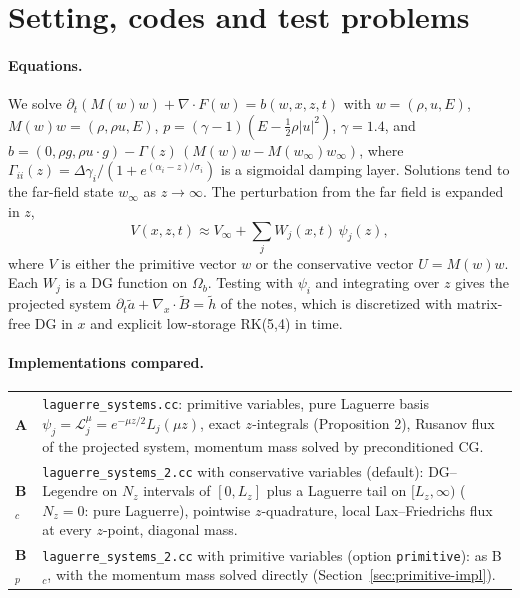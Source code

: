 \documentclass[11pt,a4paper]{article}
\newcommand{\Lag}{\mathscr{L}}
\newcommand{\code}[1]{\texttt{#1}}
\newcommand{\winf}{w_\infty}
\begin{document}
\section{Setting, codes and test problems}

\paragraph{Equations.} We solve
$\partial_t(M(w)w)+\nabla\cdot F(w)=b(w,x,z,t)$ with $w=(\rho,u,E)$,
$M(w)w=(\rho,\rho u,E)$, $p=(\gamma-1)(E-\tfrac12\rho|u|^2)$, $\gamma=1.4$, and
$b=(0,\rho g,\rho u\cdot g)-\Gamma(z)\,(M(w)w-M(\winf)\winf)$, where
$\Gamma_{ii}(z)=\Delta\gamma_i/(1+e^{(\alpha_i-z)/\sigma_i})$ is a sigmoidal
damping layer. Solutions tend to the far-field state $\winf$ as $z\to\infty$. The
perturbation from the far field is expanded in $z$,
\begin{equation}\label{eq:exp}
V(x,z,t)\approx V_\infty+\sum_j W_j(x,t)\,\psi_j(z),
\end{equation}
where $V$ is either the primitive vector $w$ or the conservative vector $U=M(w)w$.
Each $W_j$ is a DG function on $\Omega_b$. Testing with $\psi_i$ and integrating
over $z$ gives the projected system
$\partial_t\tilde a+\nabla_x\cdot\tilde B=\tilde h$ of the notes, which is
discretized with matrix-free DG in $x$ and explicit low-storage RK(5,4) in time.

\filbreak
\paragraph{Implementations compared.}
\begin{center}
\begin{tabularx}{\textwidth}{@{}lX@{}}
\toprule
\textbf{A} & \code{laguerre\_systems.cc}: primitive variables, pure Laguerre basis
  $\psi_j=\Lag^\mu_j=e^{-\mu z/2}L_j(\mu z)$, exact $z$-integrals (Proposition 2),
  Rusanov flux of the projected system, momentum mass solved by preconditioned CG.\\
\textbf{B$_c$} & \code{laguerre\_systems\_2.cc} with conservative variables (default):
  DG--Legendre on $N_z$ intervals of $[0,L_z]$ plus a Laguerre tail on $[L_z,\infty)$
  ($N_z=0$: pure Laguerre), pointwise $z$-quadrature, local Lax--Friedrichs flux at
  every $z$-point, diagonal mass.\\
\textbf{B$_p$} & \code{laguerre\_systems\_2.cc} with primitive variables (option
  \code{primitive}): as B$_c$, with the momentum mass solved directly
  (Section~\ref{sec:primitive-impl}).\\
\bottomrule
\end{tabularx}
\end{center}
\end{document}

